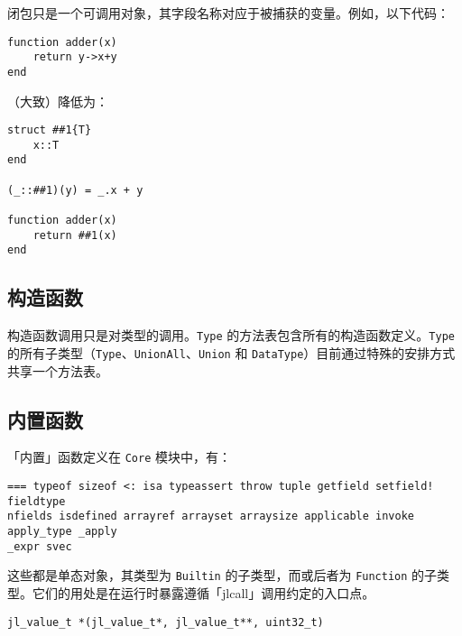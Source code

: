 闭包只是一个可调用对象，其字段名称对应于被捕获的变量。例如，以下代码：




\begin{verbatim}
function adder(x)
    return y->x+y
end
\end{verbatim}



（大致）降低为：




\begin{verbatim}
struct ##1{T}
    x::T
end

(_::##1)(y) = _.x + y

function adder(x)
    return ##1(x)
end
\end{verbatim}



\hypertarget{5490460475085720426}{}


\subsection{构造函数}



构造函数调用只是对类型的调用。\texttt{Type} 的方法表包含所有的构造函数定义。\texttt{Type} 的所有子类型（\texttt{Type}、\texttt{UnionAll}、\texttt{Union} 和 \texttt{DataType}）目前通过特殊的安排方式共享一个方法表。



\hypertarget{3874805480384047373}{}


\subsection{内置函数}



「内置」函数定义在 \texttt{Core} 模块中，有：




\begin{lstlisting}
=== typeof sizeof <: isa typeassert throw tuple getfield setfield! fieldtype
nfields isdefined arrayref arrayset arraysize applicable invoke apply_type _apply
_expr svec
\end{lstlisting}



这些都是单态对象，其类型为 \texttt{Builtin} 的子类型，而或后者为 \texttt{Function} 的子类型。它们的用处是在运行时暴露遵循「jlcall」调用约定的入口点。




\begin{lstlisting}
jl_value_t *(jl_value_t*, jl_value_t**, uint32_t)
\end{lstlisting}



